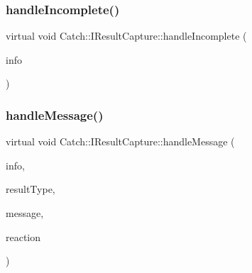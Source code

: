 \subsubsection{\texorpdfstring{handleIncomplete()}{handleIncomplete()}}
{\footnotesize\ttfamily virtual void Catch\+::\+I\+Result\+Capture\+::handle\+Incomplete (\begin{DoxyParamCaption}\item[{\mbox{\hyperlink{struct_catch_1_1_assertion_info}{Assertion\+Info}} const \&}]{info }\end{DoxyParamCaption})\hspace{0.3cm}{\ttfamily [pure virtual]}}

\mbox{\label{struct_catch_1_1_i_result_capture_a21788ebc64571abf322b80c8cc51794d}} 
\subsubsection{\texorpdfstring{handleMessage()}{handleMessage()}}
{\footnotesize\ttfamily virtual void Catch\+::\+I\+Result\+Capture\+::handle\+Message (\begin{DoxyParamCaption}\item[{\mbox{\hyperlink{struct_catch_1_1_assertion_info}{Assertion\+Info}} const \&}]{info,  }\item[{\mbox{\hyperlink{struct_catch_1_1_result_was_a624e1ee3661fcf6094ceef1f654601ef}{Result\+Was\+::\+Of\+Type}}}]{result\+Type,  }\item[{\mbox{\hyperlink{class_catch_1_1_string_ref}{String\+Ref}} const \&}]{message,  }\item[{\mbox{\hyperlink{struct_catch_1_1_assertion_reaction}{Assertion\+Reaction}} \&}]{reaction }\end{DoxyParamCaption})\hspace{0.3cm}{\ttfamily [pure virtual]}}

\mbox{\label{struct_catch_1_1_i_result_capture_ab7dbdf8aa28427119583e24dbb302c63}} 
